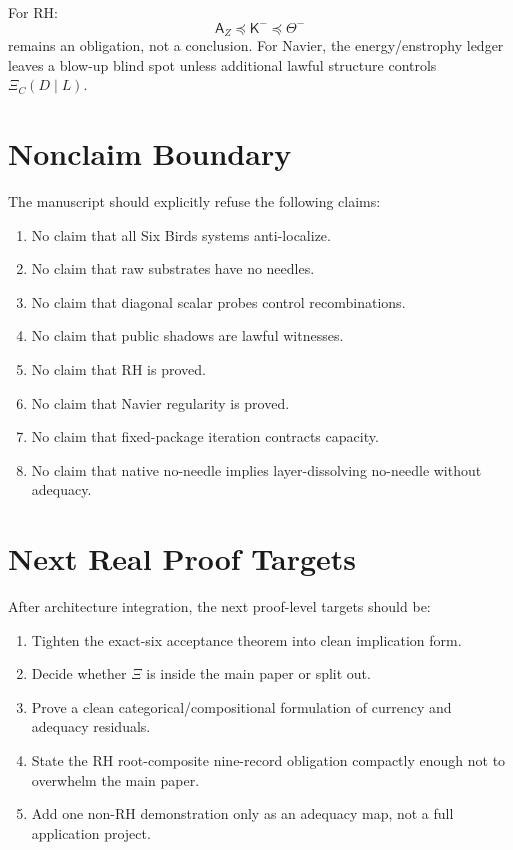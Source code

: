 \documentclass[11pt]{article}
\begin{document}
For RH:
\[
\boxed{\mathsf A_Z\preceq\mathsf K^-\preceq\Theta^-}
\]
remains an obligation, not a conclusion.  For Navier, the energy/enstrophy ledger leaves a blow-up blind spot unless additional lawful structure controls $\Xi_C(D\mid L)$.

\section{Nonclaim Boundary}

The manuscript should explicitly refuse the following claims:
\begin{enumerate}
\item No claim that all Six Birds systems anti-localize.
\item No claim that raw substrates have no needles.
\item No claim that diagonal scalar probes control recombinations.
\item No claim that public shadows are lawful witnesses.
\item No claim that RH is proved.
\item No claim that Navier regularity is proved.
\item No claim that fixed-package iteration contracts capacity.
\item No claim that native no-needle implies layer-dissolving no-needle without adequacy.
\end{enumerate}

\section{Next Real Proof Targets}

After architecture integration, the next proof-level targets should be:
\begin{enumerate}
\item Tighten the exact-six acceptance theorem into clean implication form.
\item Decide whether $\Xi$ is inside the main paper or split out.
\item Prove a clean categorical/compositional formulation of currency and adequacy residuals.
\item State the RH root-composite nine-record obligation compactly enough not to overwhelm the main paper.
\item Add one non-RH demonstration only as an adequacy map, not a full application project.
\end{enumerate}
\end{document}
